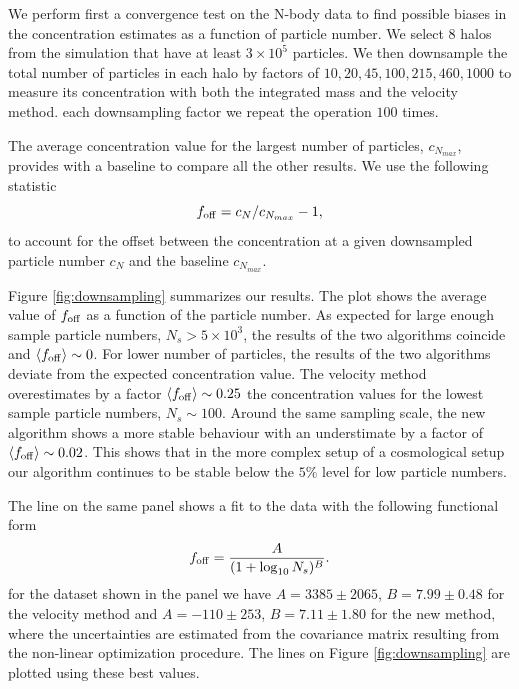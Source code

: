 \documentclass[a4,useAMS,usenatbib,usegraphicx]{mn2e}
\begin{document}
We perform first a convergence test on the N-body data to find
possible biases in the concentration estimates as a function of
particle number. 
We select $8$ halos from the simulation that have at least $3\times
10^5$ particles. 
We then downsample the total number of particles in each halo by
factors of $10, 20, 45, 100, 215, 460, 1000$ to measure its
concentration with both the integrated mass and the velocity method.
each downsampling factor we repeat the operation $100$ times.   

The average concentration value for the largest number of particles, $c_{N_{max}}$,
provides with a baseline to compare all the other results.
We use the following statistic
\begin{equation}
f_{\rm off} = c_{N} / c_{N_{max}} - 1,
\end{equation}
to account for the offset between the concentration at a given
downsampled particle number $c_{N}$ and the baseline $c_{N_{max}}$.

Figure \ref{fig:downsampling} summarizes our results. 
The plot shows the average value of $f_{\rm off}$ as a function
of the particle number.
As expected for large enough sample particle numbers, $N_{s}>5\times
10^3$, the results of the two algorithms coincide and $\langle f_{\rm
  off}\rangle\sim 0$.  
For lower number of particles, the results of the two algorithms
deviate from the expected concentration value.  
The velocity method overestimates by a factor $\langle f_{\rm 
  off}\rangle\sim 0.25$ the concentration values for the lowest
sample particle numbers, $N_{s}\sim 100$. 
Around the same sampling scale, the new algorithm shows a more stable
behaviour with an understimate by a factor of $\langle f_{\rm 
  off}\rangle \sim 0.02$.  
This shows that in the more complex setup of a cosmological setup our
algorithm continues to be stable below the $5\%$ level for low 
particle numbers.  

The line on the same panel shows a fit to the data with the following
functional form 
\begin{equation}
f_{\rm off} = \frac{A}{(1+\log_{10}N_s)^{B}}.
\label{eq:f_off}
\end{equation} 
for the dataset shown in the panel we have $A=3385\pm 2065$, $B=7.99\pm0.48
$ for the velocity method and $A=-110\pm 253$, $B=7.11\pm1.80$ for the
new method, where the uncertainties are estimated from the covariance 
matrix resulting from the non-linear optimization procedure. The lines
on Figure \ref{fig:downsampling} are plotted using these best values. 
\end{document}
